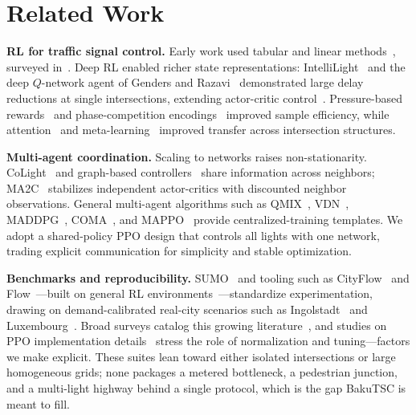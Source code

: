\documentclass[conference,a4paper]{IEEEtran}
\begin{document}
\section{Related Work}
\textbf{RL for traffic signal control.}
Early work used tabular and linear
methods~\cite{abdulhai2003reinforcement,prashanth2011reinforcement,eltantawy2013multiagent},
surveyed in~\cite{mannion2016experimental,yau2017survey}.
Deep RL enabled richer state representations: IntelliLight~\cite{wei2018intellilight}
and the deep $Q$-network agent of Genders and Razavi~\cite{genders2016using}
demonstrated large delay reductions at single intersections, extending
actor-critic control~\cite{aslani2017adaptive}. Pressure-based
rewards~\cite{wei2019presslight,chen2020toward} and phase-competition
encodings~\cite{zheng2019learning} improved sample efficiency, while
attention~\cite{oroojlooy2020attendlight} and
meta-learning~\cite{zang2020metalight,zhang2020generalight} improved transfer
across intersection structures.

\textbf{Multi-agent coordination.}
Scaling to networks raises non-stationarity. CoLight~\cite{wei2019colight} and
graph-based controllers~\cite{nishi2018traffic,devailly2021ig} share information
across neighbors; MA2C~\cite{chu2019multi} stabilizes independent actor-critics
with discounted neighbor observations. General multi-agent algorithms such as
QMIX~\cite{rashid2018qmix}, VDN~\cite{sunehag2018value}, MADDPG~\cite{lowe2017multi},
COMA~\cite{foerster2018counterfactual}, and MAPPO~\cite{yu2022surprising} provide
centralized-training templates. We adopt
a shared-policy PPO design that controls all lights with one network, trading
explicit communication for simplicity and stable optimization.

\textbf{Benchmarks and reproducibility.}
SUMO~\cite{lopez2018microscopic} and tooling such as
CityFlow~\cite{zhang2019cityflow} and Flow~\cite{wu2021flow}---built on general RL
environments~\cite{brockman2016openai}---standardize experimentation, drawing on
demand-calibrated real-city scenarios such as Ingolstadt~\cite{lobo2020intas} and
Luxembourg~\cite{codeca2015luxembourg}. Broad surveys catalog this growing
literature~\cite{wei2019survey,noaeen2022reinforcement}, and studies on PPO
implementation details~\cite{engstrom2020implementation,andrychowicz2021what}
stress the role of normalization and tuning---factors we make explicit. These
suites lean toward either isolated intersections or large homogeneous grids;
none packages a metered bottleneck, a pedestrian junction, and a multi-light
highway behind a single protocol, which is the gap BakuTSC is meant to fill.
\end{document}
